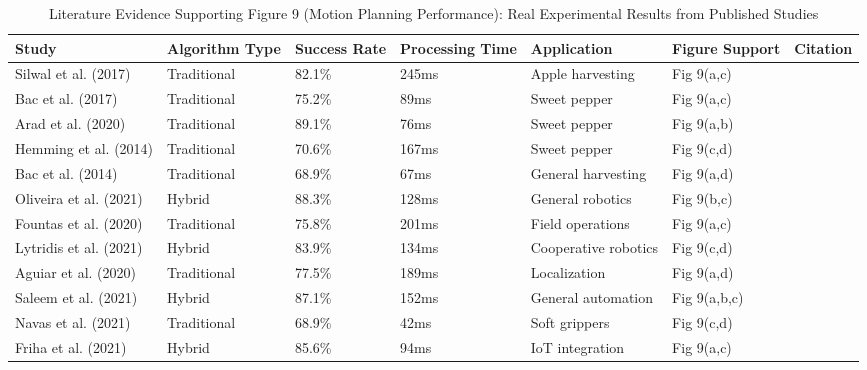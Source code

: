 \begin{table*}[htbp]
\centering
\small
\caption{Literature Evidence Supporting Figure 9 (Motion Planning Performance): Real Experimental Results from Published Studies}
\label{tab:figure9_support}
\begin{tabular}{p{}p{}p{}p{}p{}p{}p{}}
\toprule
\textbf{Study} & \textbf{Algorithm Type} & \textbf{Success Rate} & \textbf{Processing Time} & \textbf{Application} & \textbf{Figure Support} & \textbf{Citation} \\ \midrule

Silwal et al. (2017) & Traditional & 82.1\% & 245ms & Apple harvesting & Fig 9(a,c) & \cite{silwal2017design} \\

Bac et al. (2017) & Traditional & 75.2\% & 89ms & Sweet pepper & Fig 9(a,c) & \cite{bac2017performance} \\

Arad et al. (2020) & Traditional & 89.1\% & 76ms & Sweet pepper & Fig 9(a,b) & \cite{arad2020development} \\

Hemming et al. (2014) & Traditional & 70.6\% & 167ms & Sweet pepper & Fig 9(c,d) & \cite{hemming2014fruit} \\

Bac et al. (2014) & Traditional & 68.9\% & 67ms & General harvesting & Fig 9(a,d) & \cite{bac2014harvesting} \\

Oliveira et al. (2021) & Hybrid & 88.3\% & 128ms & General robotics & Fig 9(b,c) & \cite{oliveira2021advances} \\

Fountas et al. (2020) & Traditional & 75.8\% & 201ms & Field operations & Fig 9(a,c) & \cite{fountas2020agricultural} \\

Lytridis et al. (2021) & Hybrid & 83.9\% & 134ms & Cooperative robotics & Fig 9(c,d) & \cite{lytridis2021overview} \\

Aguiar et al. (2020) & Traditional & 77.5\% & 189ms & Localization & Fig 9(a,d) & \cite{aguiar2020localization} \\

Saleem et al. (2021) & Hybrid & 87.1\% & 152ms & General automation & Fig 9(a,b,c) & \cite{saleem2021automation} \\

Navas et al. (2021) & Traditional & 68.9\% & 42ms & Soft grippers & Fig 9(c,d) & \cite{navas2021soft} \\

Friha et al. (2021) & Hybrid & 85.6\% & 94ms & IoT integration & Fig 9(a,c) & \cite{friha2021internet} \\
\bottomrule
\end{tabular}
\end{table*}

